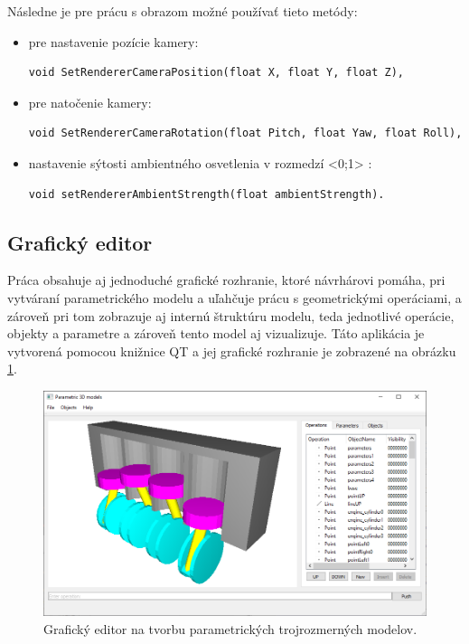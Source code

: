 Následne je pre prácu s obrazom možné používať tieto metódy:
\begin{itemize}
\item pre nastavenie pozície kamery:
 \begin{lstlisting}
void SetRendererCameraPosition(float X, float Y, float Z),
\end{lstlisting}
\item pre natočenie kamery:
 \begin{lstlisting}
void SetRendererCameraRotation(float Pitch, float Yaw, float Roll),
\end{lstlisting}
\item nastavenie sýtosti ambientného osvetlenia v rozmedzí <0;1> :
\begin{lstlisting}
void setRendererAmbientStrength(float ambientStrength).
\end{lstlisting}
\end{itemize}





\subsection*{Grafický editor}
\label{sec:grafickyEditor}

 
Práca obsahuje aj jednoduché grafické rozhranie, ktoré návrhárovi pomáha, pri vytváraní parametrického modelu a uľahčuje prácu s geometrickými operáciami, a zároveň pri tom zobrazuje aj internú štruktúru modelu, teda jednotlivé operácie, objekty a parametre a zároveň tento model aj vizualizuje.
Táto aplikácia je vytvorená pomocou knižnice QT a jej grafické rozhranie je zobrazené na obrázku \ref{fig:GraphicEditor}.


\begin{figure}[H]
	\centering
	\includegraphics[width=1\textwidth]{obrazky-figures/Parametric_editor.png}
	\caption{Grafický editor na tvorbu parametrických trojrozmerných modelov.}
	\label{fig:GraphicEditor}
\end{figure}



